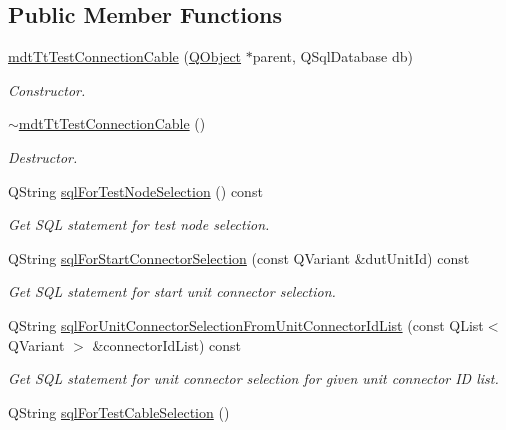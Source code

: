\subsection*{Public Member Functions}
\begin{DoxyCompactItemize}
\item 
\hyperlink{classmdt_tt_test_connection_cable_aac7d5778e8a91d9cd2f5aa3c537cf879}{mdt\-Tt\-Test\-Connection\-Cable} (\hyperlink{class_q_object}{Q\-Object} $\ast$parent, Q\-Sql\-Database db)
\begin{DoxyCompactList}\small\item\em Constructor. \end{DoxyCompactList}\item 
\hyperlink{classmdt_tt_test_connection_cable_acca8a9ed0ac97e056d4917c7fa077609}{$\sim$mdt\-Tt\-Test\-Connection\-Cable} ()
\begin{DoxyCompactList}\small\item\em Destructor. \end{DoxyCompactList}\item 
Q\-String \hyperlink{classmdt_tt_test_connection_cable_a03785cef753bae2d7d2dfd0fe1c9a6cf}{sql\-For\-Test\-Node\-Selection} () const 
\begin{DoxyCompactList}\small\item\em Get S\-Q\-L statement for test node selection. \end{DoxyCompactList}\item 
Q\-String \hyperlink{classmdt_tt_test_connection_cable_a5d5769169257b44e9087bca43ea709d1}{sql\-For\-Start\-Connector\-Selection} (const Q\-Variant \&dut\-Unit\-Id) const 
\begin{DoxyCompactList}\small\item\em Get S\-Q\-L statement for start unit connector selection. \end{DoxyCompactList}\item 
Q\-String \hyperlink{classmdt_tt_test_connection_cable_a611358757b43de273a64cfa69c9ef46e}{sql\-For\-Unit\-Connector\-Selection\-From\-Unit\-Connector\-Id\-List} (const Q\-List$<$ Q\-Variant $>$ \&connector\-Id\-List) const 
\begin{DoxyCompactList}\small\item\em Get S\-Q\-L statement for unit connector selection for given unit connector I\-D list. \end{DoxyCompactList}\item 
Q\-String \hyperlink{classmdt_tt_test_connection_cable_a983a8880bb1dcefd55101e26020f4c54}{sql\-For\-Test\-Cable\-Selection} ()

\end{DoxyCompactItemize}
